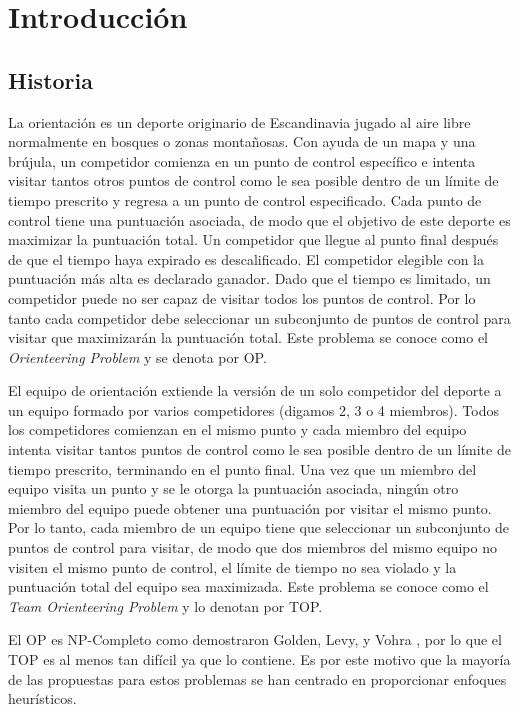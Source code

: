 \chapter{Introducción}

\section{Historia}

La orientación \cite{ChaoGoldenWasil} es un deporte originario de Escandinavia jugado al aire libre normalmente en bosques o zonas montañosas. Con ayuda de un mapa y una brújula, un competidor comienza en un punto de control específico e intenta visitar tantos otros puntos de control como le sea posible dentro de un límite de tiempo prescrito y regresa a un punto de control especificado. Cada punto de control tiene una puntuación asociada, de modo que el objetivo de este deporte es maximizar la puntuación total. Un competidor que llegue al punto final después de que el tiempo haya expirado es descalificado. El competidor elegible con la puntuación más alta es declarado ganador. Dado que el tiempo es limitado, un competidor puede no ser capaz de visitar todos los puntos de control. Por lo tanto cada competidor debe seleccionar un subconjunto de puntos de control para visitar que maximizarán la puntuación total. Este problema se conoce como el \textit{Orienteering Problem} y se denota por OP.

\bigskip

El equipo de orientación extiende la versión de un solo competidor del deporte a un equipo formado por varios competidores (digamos 2, 3 o 4 miembros). Todos los competidores comienzan en el mismo punto y cada miembro del equipo intenta visitar tantos puntos de control como le sea posible dentro de un límite de tiempo prescrito, terminando en el punto final. Una vez que un miembro del equipo visita un punto y se le otorga la puntuación asociada, ningún otro miembro del equipo puede obtener una puntuación por visitar el mismo punto. Por lo tanto, cada miembro de un equipo tiene que seleccionar un subconjunto de puntos de control para visitar, de modo que dos miembros del mismo equipo no visiten el mismo punto de control, el límite de tiempo no sea violado y la puntuación total del equipo sea maximizada. Este problema se conoce como el \textit{Team Orienteering Problem} y lo denotan por TOP.

\bigskip

El OP es NP-Completo como demostraron Golden, Levy, y Vohra \cite{GoldenLevyVohra}, por lo que el TOP es al menos tan difícil ya que lo contiene. Es por este motivo que la mayoría de las propuestas para estos problemas se han centrado en proporcionar enfoques heurísticos.

